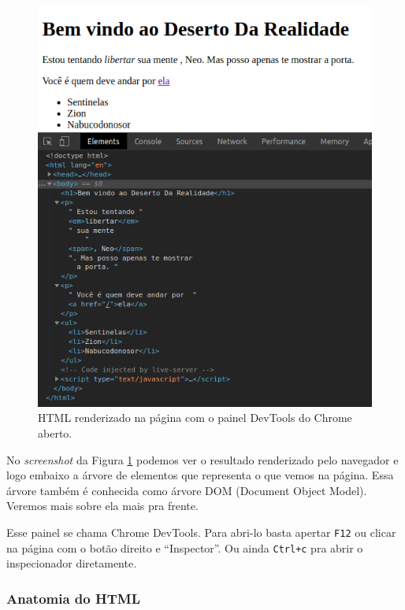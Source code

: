\begin{figure}[h!]
    \centering
    \includegraphics[scale=.5]{imgs/page-chr-dev-tools.png}
    \caption{HTML renderizado na página com o painel DevTools do Chrome aberto.}
    \label{fig:page-chr-dev-tools}
\end{figure}

No \textit{screenshot} da Figura \ref{fig:page-chr-dev-tools} podemos ver o resultado 
renderizado pelo navegador e logo embaixo a árvore de elementos que representa o que 
vemos na página. Essa árvore também é conhecida como árvore DOM (Document Object Model).
Veremos mais sobre ela mais pra frente.

Esse painel se chama Chrome DevTools. Para abri-lo basta apertar
\texttt{F12} ou clicar na página com o botão direito e ``Inspector''. Ou
ainda \texttt{Ctrl+c} pra abrir o inspecionador diretamente.

\newpage
\subsubsection{Anatomia do HTML}

